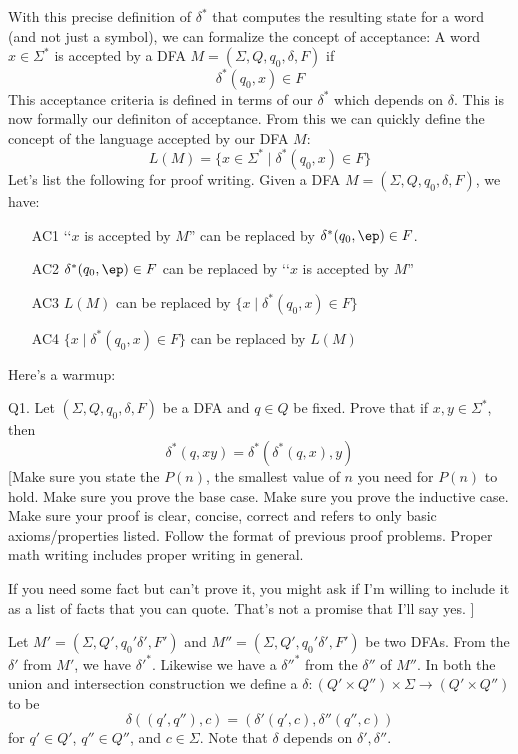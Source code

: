 With this precise definition of $\delta^*$ that computes the resulting
state for a word (and not just a symbol), we can formalize the concept of 
acceptance: A word $x \in \Sigma^*$ is accepted by a DFA 
$M = (\Sigma, Q, q_0, \delta, F)$ if
\[
\delta^*(q_0, x) \in F
\]
This acceptance criteria is defined in terms of our $\delta^*$
which depends on $\delta$.
This is now formally our definiton of acceptance.
From this we can quickly define the concept of the language accepted
by our DFA $M$:
\[
L(M) = \{x \in \Sigma^* \mid \delta^*(q_0, x) \in F \}
\]
Let's list the following for proof writing.
Given a DFA $M = (\Sigma, Q, q_0, \delta, F)$, we have:
\begin{enumerate}
\item[AC1] \lq\lq $x$ is accepted by $M$''
          can be replaced by $\delta^*(q_0, \ep) \in F$.
\item[AC2] $\delta^*(q_0, \ep) \in F$
          can be replaced by
          \lq\lq $x$ is accepted by $M$''
\item[AC3] $L(M)$ can be replaced by $\{x \mid \delta^*(q_0, x) \in F \}$
\item[AC4] $\{x \mid \delta^*(q_0, x) \in F \}$ can be replaced by $L(M)$
\end{enumerate}




\newpage
Here's a warmup:

Q1. Let $(\Sigma, Q, q_0, \delta, F)$ be a DFA and $q \in Q$ be fixed. 
Prove that if $x,y \in \Sigma^*$, then
\[
\delta^*(q, xy) = \delta^*(\delta^*(q, x), y)
\]
[Make sure you state the $P(n)$, the smallest value of $n$ you need
for $P(n)$ to hold.
Make sure you prove the base case.
Make sure you prove the inductive case.
Make sure your proof is clear, concise, correct and refers to 
only basic axioms/properties listed.
Follow the format of previous proof problems.
Proper math writing includes proper writing in general.

If you need some fact but can't prove it, you might ask if I'm
willing to include it as a list of facts that you can quote.
That's not a promise that I'll say yes.
]

\SOLUTION


\newpage
Let $M' = (\Sigma, Q', q_0' \delta', F')$
and $M'' = (\Sigma, Q', q_0' \delta', F')$ be two DFAs.
From the$\delta'$ from $M'$,  we have $\delta'^*$.
Likewise we have a $\delta''^*$ from the $\delta''$ of $M''$.
In both the union and intersection construction we define
a $\delta : (Q' \times Q'') \times \Sigma \rightarrow (Q' \times Q'')$
to be
\[
\delta((q',q''), c) = (\delta'(q', c), \delta''(q'',c))
\]
for $q' \in Q'$, $q'' \in Q''$, and $c \in \Sigma$.
Note that $\delta$ depends on $\delta', \delta''$.

